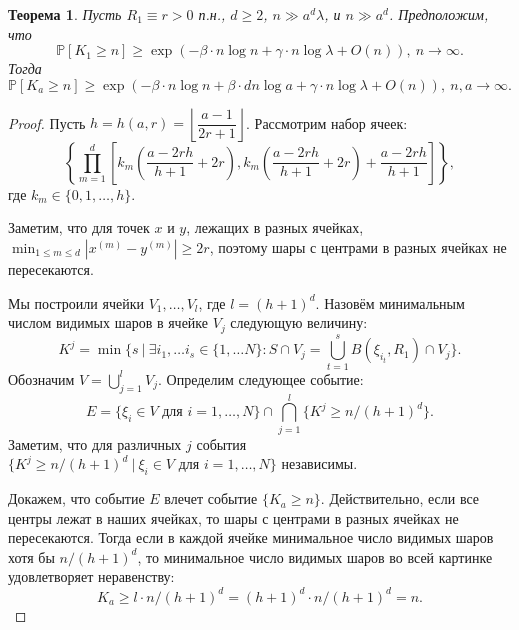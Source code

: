 \documentclass[12pt]{article}
\theoremstyle{plain}
\newtheorem{thm}{Теорема} %
\theoremstyle{definition}
\theoremstyle{remark}
\def\geq{\geqslant}
\def\leq{\leqslant}
\newcommand{\PP}{\mathbb{P}}
\begin{document}
\begin{thm}
Пусть $R_1\equiv r > 0$ п.н., $d\geq 2$, $n \gg a^d\lambda$, и $n\gg a^d$. 
Предположим, что 
\begin{equation*}
    \PP[K_1 \geq n] \geq \exp \left(-\beta\cdot n\log n + \gamma\cdot n\log\lambda + O(n)\right),\  n \to \infty.
 \end{equation*}{}
Тогда 
\begin{equation*}
    \PP[K_a \geq n] \geq \exp \left(-\beta\cdot n\log n + \beta\cdot dn\log a + \gamma\cdot n\log\lambda + O(n)\right),\  n, a \to \infty.
\end{equation*}{}
\end{thm}

\begin{proof}
Пусть $h = h(a, r) = \left\lfloor\dfrac{a-1}{2r+1}\right\rfloor$. Рассмотрим набор ячеек:
\begin{equation*}
    \left\{\prod_{m = 1}^d\left[k_m\left(\dfrac{a - 2rh}{h+1} + 2r\right), k_m\left(\dfrac{a - 2rh}{h+1} + 2r\right) + \dfrac{a - 2rh}{h+1}\right]\right\},
\end{equation*}{}
где $k_m\in \{0, 1, \ldots, h\}$.

Заметим, что для точек $x$ и $y$, лежащих в разных ячейках, $\min_{1\leq m\leq d} |x^{(m)} - y^{(m)}| \geq 2r$, поэтому шары с центрами в разных ячейках не пересекаются. 

Мы построили ячейки $V_1, \ldots, V_l$, где $l = (h+1)^d$. Назовём минимальным числом видимых шаров в ячейке $V_j$ следующую величину:
\begin{equation*}
    K^j = \min\{s\ |\ \exists i_1, \ldots i_s \in \{1, \ldots N\} \colon S \cap V_j = \bigcup_{t = 1}^s B(\xi_{i_t}, R_1)\cap V_j \}.
\end{equation*}{}
Обозначим $V = \bigcup_{j=1}^l V_j$. 
Определим следующее событие:
\begin{equation*}
    E = \{\xi_i \in V \text{ для } i = 1, \ldots, N\} \cap \bigcap_{j = 1}^l\{K^j \geq n/(h+1)^d\}.
\end{equation*}{}
Заметим, что для различных $j$ события $\{K^j \geq n/(h+1)^d\ |\ \xi_i \in V \text{ для } i = 1, \ldots, N\}$ независимы.

Докажем, что событие $E$ влечет событие $\{K_a \geq n\}$. Действительно, если все центры лежат в наших ячейках, то шары с центрами в разных ячейках не пересекаются. Тогда если в каждой ячейке минимальное число видимых шаров хотя бы $n/(h+1)^d$, то минимальное число видимых шаров во всей картинке удовлетворяет неравенству:
\begin{equation*}
    K_a \geq l\cdot n/(h+1)^d = (h+1)^d \cdot n/(h+1)^d  = n.
\end{equation*}{}


\end{proof}
\end{document}
